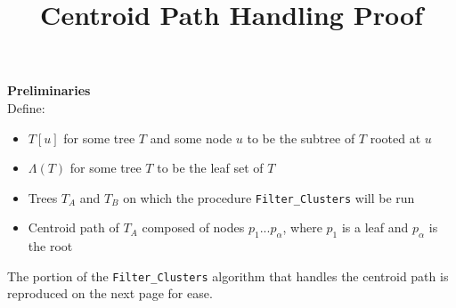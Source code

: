 \documentclass[a4paper]{article}
\title{Centroid Path Handling Proof}
\begin{document}
    \maketitle

    \textbf{Preliminaries}\\

    Define:
    \begin{itemize}
        \item $T[u]$ for some tree $T$ and some node $u$ to be the subtree of $T$ rooted at $u$
        \item $\Lambda(T)$ for some tree $T$ to be the leaf set of $T$
        \item Trees $T_A$ and $T_B$ on which the procedure \texttt{Filter\_Clusters} will be run
        \item Centroid path of $T_A$ composed of nodes $p_1 ... p_{\alpha}$, where $p_1$ is a leaf and $p_{\alpha}$ is the root
    \end{itemize}

    The portion of the \texttt{Filter\_Clusters} algorithm that handles the centroid path is reproduced on the next page for ease.\\
\end{document}
